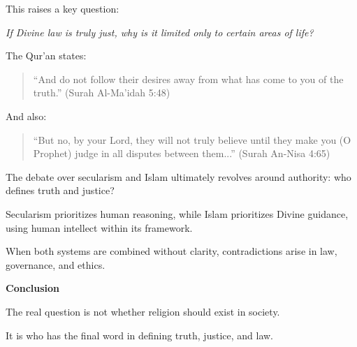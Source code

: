 \documentclass[12pt]{article}
\begin{document}
This raises a key question:

\textit{If Divine law is truly just, why is it limited only to certain areas of life?}

The Qur’an states:

\begin{quote}
``And do not follow their desires away from what has come to you of the truth.'' (Surah Al-Ma’idah 5:48)
\end{quote}

And also:

\begin{quote}
``But no, by your Lord, they will not truly believe until they make you (O Prophet) judge in all disputes between them...'' (Surah An-Nisa 4:65)
\end{quote}

The debate over secularism and Islam ultimately revolves around authority: who defines truth and justice?

Secularism prioritizes human reasoning, while Islam prioritizes Divine guidance, using human intellect within its framework.

When both systems are combined without clarity, contradictions arise in law, governance, and ethics.

\textbf{Conclusion}

The real question is not whether religion should exist in society.

It is who has the final word in defining truth, justice, and law.
\end{document}
